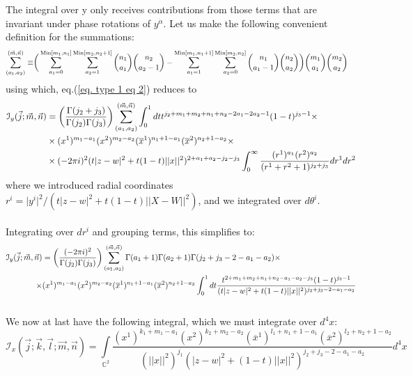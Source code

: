 \documentclass[../main.tex]{subfiles}
\begin{document}
The integral over y only receives contributions from those terms that are invariant under phase rotations of $y^{\dot{\alpha}}$. Let us make the following convenient definition
for the summations:
\begingroup \allowdisplaybreaks \begin{align}
    \sum_{(a_1,a_2)}^{(\vec{m},\vec{n})} \equiv &\bigg( \sum_{a_1=0}^{\text{Min}[m_1,n_1]} \sum_{a_2=1}^{\text{Min}[m_2,n_2+1]} {n_1 \choose a_1}  {n_2 \choose a_2-1}-\sum_{a_1=1}^{\text{Min}[m_1,n_1+1]} \sum_{a_2=0}^{\text{Min}[m_2,n_2]} {n_1 \choose a_1-1}  {n_2 \choose a_2}\bigg) {m_1 \choose a_1} {m_2 \choose a_2} \notag
\end{align} \endgroup
using which, eq.(\ref{eq. type 1 eq 2}) reduces to
\begingroup \allowdisplaybreaks \begin{align}
\mathcal{I}_y (\vec{j};\vec{m}, \vec{n}) &= \bigg( \frac{\Gamma(j_2+j_3)}{\Gamma(j_2) \Gamma(j_3)} \bigg) \sum_{(a_1,a_2)}^{(\vec{m},\vec{n})} \int_0^1 dt t^{j_2+m_1+m_2+n_1+n_2-2a_1-2a_2-1} (1-t)^{j_3-1}  \times \\
    &\times (x^1)^{m_1-a_1}(x^2)^{m_2-a_2} (\overline{x}^1)^{n_1+1-a_1}(\overline{x}^2)^{n_2+1-a_2} \times \notag\\
    & \times (-2 \pi i)^2 (t\vert z-w \vert^2+t(1-t) \vert \vert x \vert \vert^2)^{2+a_1+a_2-j_2-j_3} \int_0^{\infty} \frac{(r^1)^{a_1} (r^2)^{a_2} }{(r^1+r^2+1)^{j_2+j_3}} dr^1 dr^2 \notag
\end{align} \endgroup
where we introduced radial coordinates $r^i = \vert y^i \vert^2/(t\vert z-w\vert^2+t(1-t)\vert \vert X-W \vert \vert^2)$, and we integrated over $d\theta^i$. \\ \\
Integrating over $dr^i$ and grouping terms, this simplifies to:
\begingroup \allowdisplaybreaks \begin{align}
\mathcal{I}_y (\vec{j};\vec{m}, \vec{n}) &= \bigg( \frac{(-2\pi i)^2}{\Gamma(j_2) \Gamma(j_3)} \bigg) \sum_{(a_1,a_2)}^{(\vec{m},\vec{n})} \Gamma(a_1+1) \Gamma(a_2+1) \Gamma(j_2+j_3-2-a_1-a_2) \times \notag \\
\times& (x^1)^{m_1-a_1} (x^2)^{m_2-a_2} (\overline{x}^1)^{n_1+1-a_1} (\overline{x}^2)^{n_2+1-a_2} \int_0^1 dt \frac{t^{2+m_1+m_2+n_1+n_2-a_1-a_2-j_3} (1-t)^{j_3-1}}{(t\vert z-w \vert^2+t(1-t) \vert \vert x \vert \vert^2)^{j_2+j_3-2-a_1-a_2}} \notag
\end{align} \endgroup
\\ 
We now at last have the following integral, which we must integrate over $d^4x$:
\begin{equation}
    \mathcal{I}_x (\vec{j};\vec{k},\vec{l};\vec{m}, \vec{n}) = \underset{\mathbb{C}^2}{\int} \frac{ (x^1)^{k_1+m_1-a_1} (x^2)^{k_2+m_2-a_2} (\overline{x}^1)^{l_1+n_1+1-a_1} (\overline{x}^2)^{l_2+n_2+1-a_2}}{(\vert \vert x \vert \vert^2)^{j_1} (\vert z-w \vert^2+(1-t) \vert \vert x \vert \vert^2)^{j_2+j_3-2-a_1-a_2}} d^4x
\end{equation}
\end{document}
